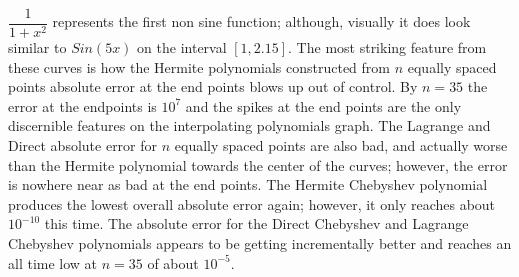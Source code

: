 \documentclass[11pt]{article}%
\begin{document}
$\dfrac{1}{1 + x^2}$ represents the first non sine function; although, visually it does look similar to $Sin(5x)$ on the interval $[1, 2.15]$. The most striking feature from these curves is how the Hermite polynomials constructed from $n$ equally spaced points absolute error at the end points blows up out of control. By $n = 35$ the error at the endpoints is $10^{7}$ and the spikes at the end points are the only discernible features on the interpolating polynomials graph. The Lagrange and Direct absolute error for $n$ equally spaced points are also bad, and actually worse than the Hermite polynomial towards the center of the curves; however, the error is nowhere near as bad at the end points. The Hermite Chebyshev polynomial produces the lowest overall absolute error again; however, it only reaches about $10^{-10}$ this time. The absolute error for the Direct Chebyshev and Lagrange Chebyshev polynomials appears to be getting incrementally better and reaches an all time low at $n = 35$ of about $10^{-5}$.

\end{document}

